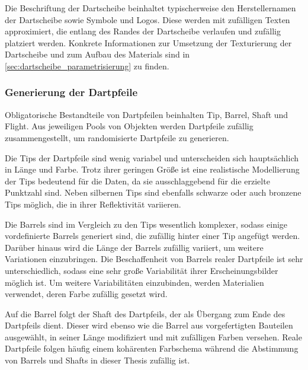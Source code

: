 Die Beschriftung der Dartscheibe beinhaltet typischerweise den Herstellernamen der Dartscheibe sowie Symbole und Logos. Diese werden mit zufälligen Texten approximiert, die entlang des Randes der Dartscheibe verlaufen und zufällig platziert werden. Konkrete Informationen zur Umsetzung der Texturierung der Dartscheibe und zum Aufbau des Materials sind in \autoref{sec:dartscheibe_parametrisierung} zu finden.

\subsubsection{Generierung der Dartpfeile}

Obligatorische Bestandteile von Dartpfeilen beinhalten Tip, Barrel, Shaft und Flight. Aus jeweiligen Pools von Objekten werden Dartpfeile zufällig zusammengestellt, um randomisierte Dartpfeile zu generieren.

Die Tips der Dartpfeile sind wenig variabel und unterscheiden sich hauptsächlich in Länge und Farbe. Trotz ihrer geringen Größe ist eine realistische Modellierung der Tips bedeutend für die Daten, da sie ausschlaggebend für die erzielte Punktzahl sind. Neben silbernen Tips sind ebenfalls schwarze oder auch bronzene Tips möglich, die in ihrer Reflektivität variieren.

Die Barrels sind im Vergleich zu den Tips wesentlich komplexer, sodass einige vordefinierte Barrels generiert sind, die zufällig hinter einer Tip angefügt werden. Darüber hinaus wird die Länge der Barrels zufällig variiert, um weitere Variationen einzubringen. Die Beschaffenheit von Barrels realer Dartpfeile ist sehr unterschiedlich, sodass eine sehr große Variabilität ihrer Erscheinungsbilder möglich ist. Um weitere Variabilitäten einzubinden, werden Materialien verwendet, deren Farbe zufällig gesetzt wird.

Auf die Barrel folgt der Shaft des Dartpfeils, der als Übergang zum Ende des Dartpfeils dient. Dieser wird ebenso wie die Barrel aus vorgefertigten Bauteilen ausgewählt, in seiner Länge modifiziert und mit zufälligen Farben versehen. Reale Dartpfeile folgen häufig einem kohärenten Farbschema während die Abstimmung von Barrels und Shafts in dieser Thesis zufällig ist.

